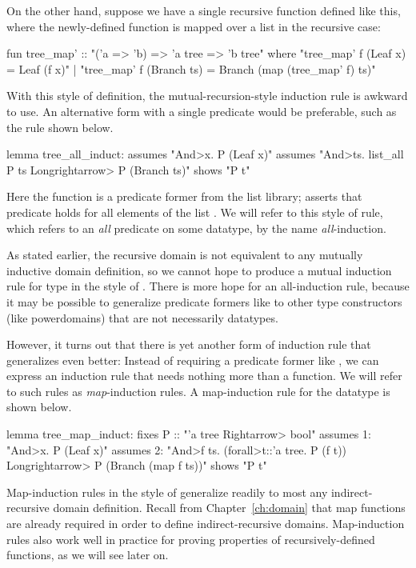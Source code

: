 On the other hand, suppose we have a single recursive function defined like this, where the newly-defined function is mapped over a list in the recursive case:
%
\begin{isacode}
fun tree_map' :: "('a => 'b) => 'a tree => 'b tree"
  where "tree_map' f (Leaf x) = Leaf (f x)"
  | "tree_map' f (Branch ts) = Branch (map (tree_map' f) ts)"
\end{isacode}
%
With this style of definition, the mutual-recursion-style induction rule is awkward to use. An alternative form with a single predicate would be preferable, such as the rule  shown below.
%
\begin{isacode}
lemma tree_all_induct:
  assumes "\<And>x. P (Leaf x)"
  assumes "\<And>ts. list_all P ts \<Longrightarrow> P (Branch ts)"
  shows "P t"
\end{isacode}
%
Here the function  is a predicate former from the list library;  asserts that predicate  holds for all elements of the list . We will refer to this style of rule, which refers to an \emph{all} predicate on some datatype, by the name \emph{all}-induction.

As stated earlier, the recursive domain  is not equivalent to any mutually inductive domain definition, so we cannot hope to produce a mutual induction rule for type  in the style of . There is more hope for an all-induction rule, because it may be possible to generalize predicate formers like  to other type constructors (like powerdomains) that are not necessarily datatypes.

However, it turns out that there is yet another form of induction rule that generalizes even better: Instead of requiring a predicate former like , we can express an induction rule that needs nothing more than a  function. We will refer to such rules as \emph{map}-induction rules. A map-induction rule for the  datatype is shown below.
%
\begin{isacode}
lemma tree_map_induct:
  fixes P :: "'a tree \<Rightarrow> bool"
  assumes 1: "\<And>x. P (Leaf x)"
  assumes 2: "\<And>f ts. (\<forall>t::'a tree. P (f t)) \<Longrightarrow> P (Branch (map f ts))"
  shows "P t"
\end{isacode}
%
Map-induction rules in the style of  generalize readily to most any indirect-recursive domain definition. Recall from Chapter~\ref{ch:domain} that map functions are already required in order to define indirect-recursive domains. Map-induction rules also work well in practice for proving properties of recursively-defined functions, as we will see later on.

